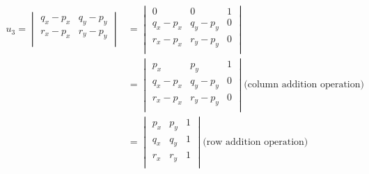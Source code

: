 \documentclass[12pt]{article}
\begin{document}
$$
\begin{aligned}
	u_3 = 
	\begin{vmatrix}
		q_x - p_x & q_y - p_y \\
		r_x - p_x & r_y - p_y \\
	\end{vmatrix}  
    &= 
	\begin{vmatrix}
		0 &  0 & 1 \\
		q_x - p_x & q_y - p_y & 0 \\
		r_x - p_x & r_y - p_y & 0 \\
	\end{vmatrix}   \\
	&= \begin{vmatrix}
		p_x &   p_y  & 1 \\
		q_x - p_x & q_y - p_y & 0 \\
		r_x - p_x & r_y - p_y & 0 \\
	\end{vmatrix} \text{(column addition operation)} \\
	&= \begin{vmatrix}
		p_x &  p_y & 1 \\
		q_x & q_y  & 1 \\
		r_x & r_y  & 1 \\
	\end{vmatrix}  \text{(row addition operation)}
\end{aligned}
$$
\end{document}
